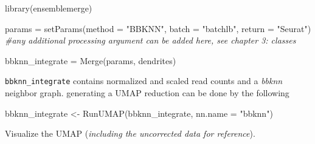 \documentclass[
]{book}
\newenvironment{Shaded}{\begin{snugshade}}{\end{snugshade}}
\newcommand{\AttributeTok}[1]{\textcolor[rgb]{0.77,0.63,0.00}{#1}}
\newcommand{\CommentTok}[1]{\textcolor[rgb]{0.56,0.35,0.01}{\textit{#1}}}
\newcommand{\FunctionTok}[1]{\textcolor[rgb]{0.00,0.00,0.00}{#1}}
\newcommand{\NormalTok}[1]{#1}
\newcommand{\OtherTok}[1]{\textcolor[rgb]{0.56,0.35,0.01}{#1}}
\newcommand{\StringTok}[1]{\textcolor[rgb]{0.31,0.60,0.02}{#1}}
\begin{document}
\begin{Shaded}
\begin{Highlighting}[]
\FunctionTok{library}\NormalTok{(ensemblemerge)}

\NormalTok{params }\OtherTok{=} \FunctionTok{setParams}\NormalTok{(}\AttributeTok{method =} \StringTok{"BBKNN"}\NormalTok{, }\AttributeTok{batch =} \StringTok{"batchlb"}\NormalTok{, }\AttributeTok{return =} \StringTok{"Seurat"}\NormalTok{) }\CommentTok{\#any additional processing argument can be added here, see chapter 3: classes}

\NormalTok{bbknn\_integrate }\OtherTok{=} \FunctionTok{Merge}\NormalTok{(params, dendrites)}
\end{Highlighting}
\end{Shaded}

\texttt{bbknn\_integrate} contains normalized and scaled read counts and a \emph{bbknn} neighbor graph. generating a UMAP reduction can be done by the following

\begin{Shaded}
\begin{Highlighting}[]
\NormalTok{bbknn\_integrate }\OtherTok{\textless{}{-}} \FunctionTok{RunUMAP}\NormalTok{(bbknn\_integrate, }\AttributeTok{nn.name =} \StringTok{"bbknn"}\NormalTok{)}
\end{Highlighting}
\end{Shaded}

Visualize the UMAP (\emph{including the uncorrected data for reference}).
\end{document}

